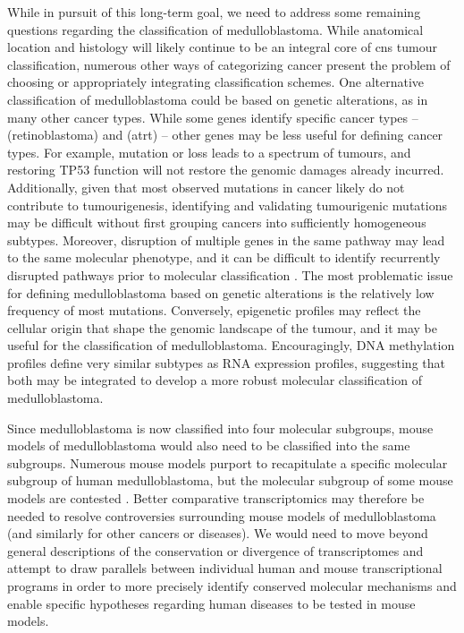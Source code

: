 While in pursuit of this long-term goal, we need to address some remaining questions regarding the classification of medulloblastoma. While anatomical location and histology will likely continue to be an integral core of \gls{cns} tumour classification, numerous other ways of categorizing cancer present the problem of choosing or appropriately integrating classification schemes. One alternative classification of medulloblastoma could be based on genetic alterations, as in many other cancer types. While some genes identify specific cancer types --  (retinoblastoma) and  (\gls{atrt}) -- other genes may be less useful for defining cancer types. For example,  mutation or loss leads to a spectrum of tumours, and restoring TP53 function will not restore the genomic damages already incurred. Additionally, given that most observed mutations in cancer likely do not contribute to tumourigenesis, identifying and validating tumourigenic mutations may be difficult without first grouping cancers into sufficiently homogeneous subtypes. Moreover, disruption of multiple genes in the same pathway may lead to the same molecular phenotype, and it can be difficult to identify recurrently disrupted pathways prior to molecular classification . The most problematic issue for defining medulloblastoma based on genetic alterations is the relatively low frequency of most mutations. Conversely, epigenetic profiles may reflect the cellular origin that shape the genomic landscape of the tumour, and it may be useful for the classification of medulloblastoma. Encouragingly, DNA methylation profiles define very similar subtypes as RNA expression profiles, suggesting that both may be integrated to develop a more robust molecular classification of medulloblastoma.

Since medulloblastoma is now classified into four molecular subgroups, mouse models of medulloblastoma would also need to be classified into the same subgroups. Numerous mouse models purport to recapitulate a specific molecular subgroup of human medulloblastoma,  but the molecular subgroup of some mouse models are contested . Better comparative transcriptomics may therefore be needed to resolve controversies surrounding mouse models of medulloblastoma (and similarly for other cancers or diseases). We would need to move beyond general descriptions of the conservation or divergence of transcriptomes and attempt to draw parallels between individual human and mouse transcriptional programs in order to more precisely identify conserved molecular mechanisms and enable specific hypotheses regarding human diseases to be tested in mouse models.

